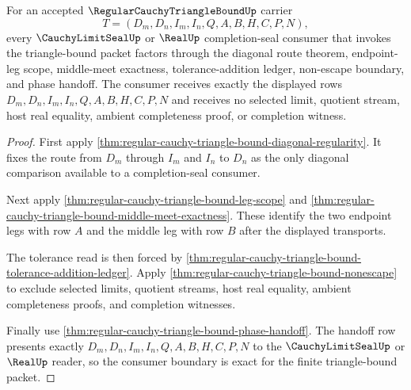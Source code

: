 \begin{theorem}
\label{thm:regular-cauchy-triangle-bound-completion-seal-consumer-exactness}
For an accepted $\RegularCauchyTriangleBoundUp$ carrier
$$
T=(D_m,D_n,I_m,I_n,Q,A,B,H,C,P,N),
$$
every $\CauchyLimitSealUp$ or $\RealUp$ completion-seal consumer that invokes the triangle-bound packet factors through the diagonal route theorem, endpoint-leg scope, middle-meet exactness, tolerance-addition ledger, non-escape boundary, and phase handoff. The consumer receives exactly the displayed rows $D_m,D_n,I_m,I_n,Q,A,B,H,C,P,N$ and receives no selected limit, quotient stream, host real equality, ambient completeness proof, or completion witness.
\end{theorem}
\begin{proof}
First apply \autoref{thm:regular-cauchy-triangle-bound-diagonal-regularity}. It fixes the route from $D_m$ through $I_m$ and $I_n$ to $D_n$ as the only diagonal comparison available to a completion-seal consumer.

Next apply \autoref{thm:regular-cauchy-triangle-bound-leg-scope} and \autoref{thm:regular-cauchy-triangle-bound-middle-meet-exactness}. These identify the two endpoint legs with row $A$ and the middle leg with row $B$ after the displayed transports.

The tolerance read is then forced by \autoref{thm:regular-cauchy-triangle-bound-tolerance-addition-ledger}. Apply \autoref{thm:regular-cauchy-triangle-bound-nonescape} to exclude selected limits, quotient streams, host real equality, ambient completeness proofs, and completion witnesses.

Finally use \autoref{thm:regular-cauchy-triangle-bound-phase-handoff}. The handoff row presents exactly $D_m,D_n,I_m,I_n,Q,A,B,H,C,P,N$ to the $\CauchyLimitSealUp$ or $\RealUp$ reader, so the consumer boundary is exact for the finite triangle-bound packet.
\end{proof}

